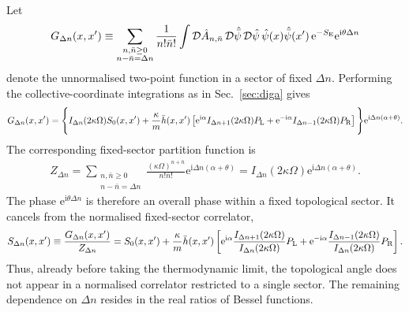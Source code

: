 \documentclass[review]{elsarticle}
\numberwithin{equation}{section}
\numberwithin{table}{section}
\numberwithin{figure}{section}
\def\i{\mathrm{i}}
\def\e{\mathrm{e}}
\begin{document}
Let
\begin{align}
    G_{\Delta n}(x,x')
    \equiv
    \sum_{\substack{n,\bar n\geq0\\ n-\bar n=\Delta n}}
    \frac{1}{n!\bar n!}
    \int
    \mathcal D\hat A_{n,\bar n}\,
    \mathcal D\hat{\bar\psi}\,
    \mathcal D\hat\psi\,
    \hat\psi(x)\hat{\bar\psi}(x')\,
    \e^{-S_{\rm E}}
    \e^{\i\theta\Delta n}
    \label{eq:fixed-sector-unnormalised-correlator}
\end{align}
denote the unnormalised two-point function in a sector of fixed $\Delta n$. Performing the collective-coordinate integrations as in Sec.~\ref{sec:diga} gives
\begin{align}
    G_{\Delta n}(x,x')
    =
    \Bigg\{
        I_{\Delta n}(2\kappa\Omega)
        S_0(x,x')
        +
        \frac{\kappa}{m}
        \bar h(x,x')
        \left[
            \e^{\i\alpha}
            I_{\Delta n+1}(2\kappa\Omega)P_{\rm L}
            +
            \e^{-\i\alpha}
            I_{\Delta n-1}(2\kappa\Omega)P_{\rm R}
        \right]
    \Bigg\}
    \e^{\i\Delta n(\alpha+\theta)}.
    \label{eq:fixed-sector-fermion-correlator}
\end{align}
The corresponding fixed-sector partition function is
\begin{align}
    Z_{\Delta n}
    =
    \sum_{\substack{n,\bar n\geq0\\n-\bar n=\Delta n}}
    \frac{
        (\kappa\Omega)^{n+\bar n}
    }{
        n!\bar n!
    }
    \e^{\i\Delta n(\alpha+\theta)}
    =
    I_{\Delta n}(2\kappa\Omega)
    \e^{\i\Delta n(\alpha+\theta)}.
    \label{eq:Z-Deltan}
\end{align}
The phase $\e^{\i\theta\Delta n}$ is therefore an overall phase within a fixed topological sector. It cancels from the normalised fixed-sector correlator,
\begin{align}
    S_{\Delta n}(x,x')
    \equiv
    \frac{
        G_{\Delta n}(x,x')
    }{
        Z_{\Delta n}
    }
    =
    S_0(x,x')
    +
    \frac{\kappa}{m}
    \bar h(x,x')
    \left[
        \e^{\i\alpha}
        \frac{
            I_{\Delta n+1}(2\kappa\Omega)
        }{
            I_{\Delta n}(2\kappa\Omega)
        }
        P_{\rm L}
        +
        \e^{-\i\alpha}
        \frac{
            I_{\Delta n-1}(2\kappa\Omega)
        }{
            I_{\Delta n}(2\kappa\Omega)
        }
        P_{\rm R}
    \right].
    \label{eq:normalised-fixed-sector-correlator}
\end{align}
Thus, already before taking the thermodynamic limit, the topological angle does not appear in a normalised correlator restricted to a single sector. The remaining dependence on $\Delta n$ resides in the real ratios of Bessel functions.
\end{document}
